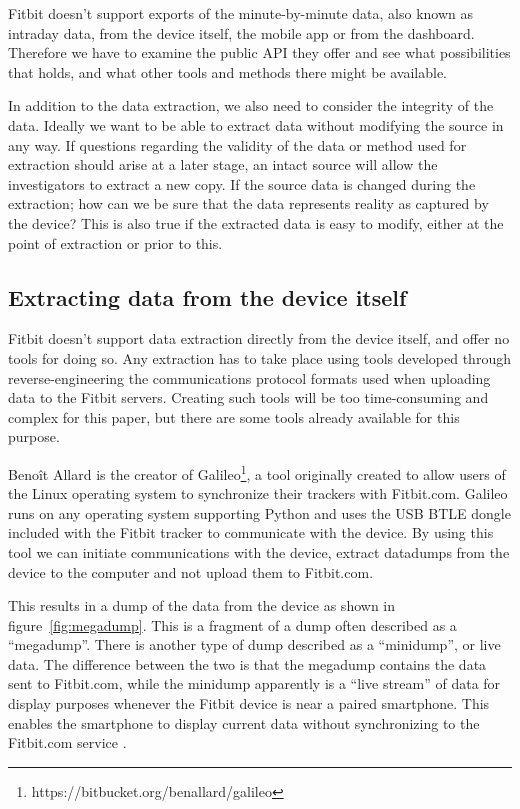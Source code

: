 \documentclass[a4paper,11pt,dvips]{article}
\begin{document}
\noindent
Fitbit doesn't support exports of the minute-by-minute data, also known as intraday data, from the device itself, the mobile app or from the dashboard. Therefore we have to examine the public API they offer and see what possibilities that holds, and what other tools and methods there might be available.

In addition to the data extraction, we also need to consider the integrity of the data. Ideally we want to be able to extract data without modifying the source in any way. If questions regarding the validity of the data or method used for extraction should arise at a later stage, an intact source will allow the investigators to extract a new copy. If the source data is changed during the extraction; how can we be sure that the data represents reality as captured by the device? This is also true if the extracted data is easy to modify, either at the point of extraction or prior to this.

\subsection{Extracting data from the device itself}
Fitbit doesn't support data extraction directly from the device itself, and offer no tools for doing so. Any extraction has to take place using tools developed through reverse-engineering the communications protocol formats used when uploading data to the Fitbit servers. Creating such tools will be too time-consuming and complex for this paper, but there are some tools already available for this purpose.

Benoît Allard is the creator of Galileo\footnote{https://bitbucket.org/benallard/galileo}, a tool originally created to allow users of the Linux operating system to synchronize their trackers with Fitbit.com. Galileo runs on any operating system supporting Python and uses the USB BTLE dongle included with the Fitbit tracker to communicate with the device. By using this tool we can initiate communications with the device, extract datadumps from the device to the computer and not upload them to Fitbit.com.

This results in a dump of the data from the device as shown in figure~\ref{fig:megadump}. This is a fragment of a dump often described as a “megadump”. There is another type of dump described as a “minidump”, or live data. The difference between the two is that the megadump contains the data sent to Fitbit.com, while the minidump apparently is a “live stream” of data for display purposes whenever the Fitbit device is near a paired smartphone. This enables the smartphone to display current data without synchronizing to the Fitbit.com service \citep{cyr2014security, Aprville:2015a}.
\end{document}
